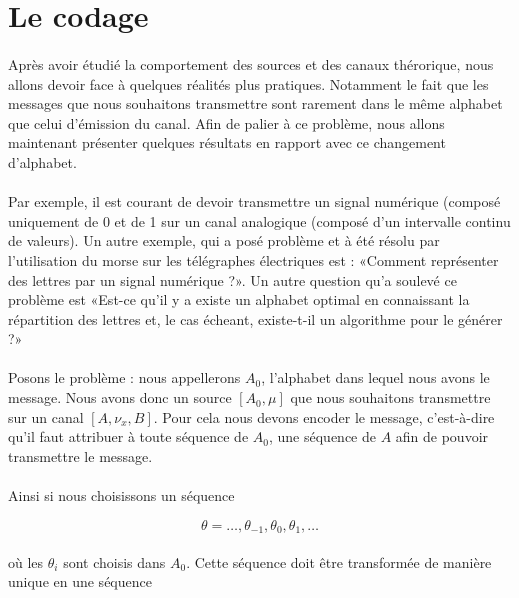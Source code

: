 \documentclass[a4paper,12pt]{article}
\begin{document}
\section{Le codage}
	\paragraph{}
	Après avoir étudié la comportement des sources et des canaux thérorique, nous
	allons devoir face à quelques réalités plus pratiques. Notamment le fait
	que les messages que nous souhaitons transmettre sont rarement dans le 
	même alphabet que celui d'émission du canal. Afin de palier à ce problème,
	nous allons maintenant présenter quelques résultats en rapport avec ce 
	changement d'alphabet. 
	
	\paragraph{}
	Par exemple, il est courant de devoir transmettre un signal numérique
	(composé uniquement de 0 et de 1 sur un canal analogique (composé 
	d'un intervalle continu de valeurs).
	Un autre exemple, qui a posé problème et à été résolu par l'utilisation
	du morse sur les télégraphes électriques est : «Comment représenter des 
	lettres par un signal numérique ?». Un autre question qu'a soulevé ce problème est
	«Est-ce qu'il y a existe un alphabet optimal en connaissant la répartition
	des lettres et, le cas écheant, existe-t-il un algorithme pour le générer ?»
	
	\paragraph{}
	Posons le problème :
	nous appellerons $A_0$, l'alphabet dans lequel nous avons le message. Nous avons donc un source 
	$[A_0,\mu]$ que nous souhaitons transmettre sur un canal $[A,\nu_x,B]$. Pour cela nous devons encoder
	le message, c'est-à-dire qu'il faut attribuer à toute séquence de $A_0$, une séquence de $A$ afin de 
	pouvoir transmettre le message.

	\paragraph{}
	Ainsi si nous choisissons un séquence

	\[\theta = \dots,\theta_{-1},\theta_{0},\theta_{1},\dots\]

	\paragraph{}
	où les $\theta_i$ sont choisis dans $A_0$. Cette séquence doit être transformée de manière unique en une séquence
\end{document}
